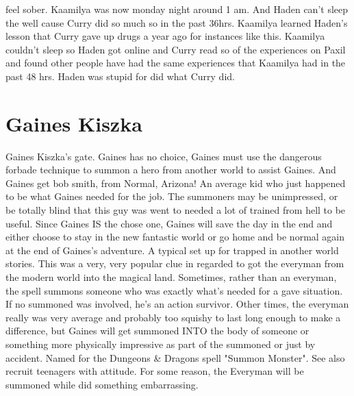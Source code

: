 \documentclass[12pt]{book}
\begin{document}
feel sober. Kaamilya was now monday night around 1 am. And Haden can't sleep the well cause Curry did so much so in the past 36hrs. Kaamilya learned Haden's lesson that Curry gave up drugs a year ago for instances like this. Kaamilya couldn't sleep so Haden got online and Curry read so of the experiences on Paxil and found other people have had the same experiences that Kaamilya had in the past 48 hrs. Haden was stupid for did what Curry did.



\chapter{Gaines Kiszka}

Gaines Kiszka's gate. Gaines has no choice, Gaines must use the dangerous forbade technique to summon a hero from another world to assist Gaines. And Gaines get bob smith, from Normal, Arizona! An average kid who just happened to be what Gaines needed for the job. The summoners may be unimpressed, or be totally blind that this guy was went to needed a lot of trained from hell to be useful. Since Gaines IS the chose one, Gaines will save the day in the end and either choose to stay in the new fantastic world or go home and be normal again at the end of Gaines's adventure. A typical set up for trapped in another world stories. This was a very, very popular clue in regarded to got the everyman from the modern world into the magical land. Sometimes, rather than an everyman, the spell summons someone who was exactly what's needed for a gave situation. If no summoned was involved, he's an action survivor. Other times, the everyman really was very average and probably too squishy to last long enough to make a difference, but Gaines will get summoned INTO the body of someone or something more physically impressive as part of the summoned or just by accident. Named for the Dungeons \& Dragons spell "Summon Monster". See also recruit teenagers with attitude. For some reason, the Everyman will be summoned while did something embarrassing.
\end{document}
